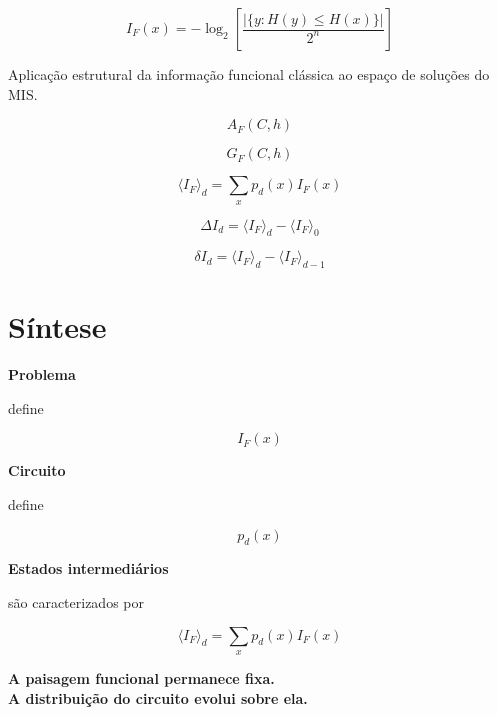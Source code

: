 \documentclass[11pt,a4paper]{article}
\begin{document}
\begin{definitionbox}

\[
\boxed{
I_F(x)
=
-\log_2
\left[
\frac{
|\{y:H(y)\leq H(x)\}|
}{
2^n
}
\right]
}
\]

Aplicação estrutural da informação funcional clássica
ao espaço de soluções do MIS.

\end{definitionbox}

\begin{proposedbox}

\[
A_F(C,h)
\]

\[
G_F(C,h)
\]

\[
\boxed{
\langle I_F\rangle_d
=
\sum_x p_d(x)I_F(x)
}
\]

\[
\Delta I_d
=
\langle I_F\rangle_d-\langle I_F\rangle_0
\]

\[
\delta I_d
=
\langle I_F\rangle_d-\langle I_F\rangle_{d-1}
\]

\end{proposedbox}

\section*{Síntese}

\begin{mainidea}

\centering

\textbf{\large Problema}

define

\[
I_F(x)
\]

\textbf{\large Circuito}

define

\[
p_d(x)
\]

\textbf{\large Estados intermediários}

são caracterizados por

\[
\boxed{
\langle I_F\rangle_d
=
\sum_x p_d(x)I_F(x)
}
\]

\vspace{0.3cm}

\textbf{
A paisagem funcional permanece fixa.\\
A distribuição do circuito evolui sobre ela.
}

\end{mainidea}

\end{document}
